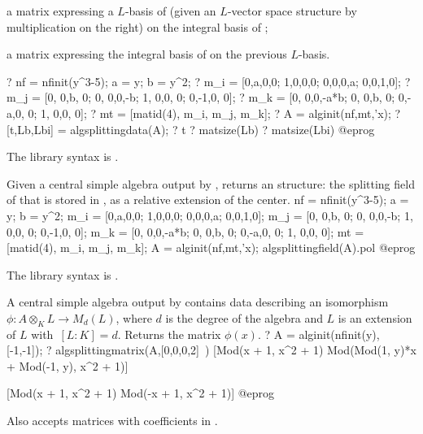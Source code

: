  \item a matrix  expressing a $L$-basis of  (given an
$L$-vector space structure by multiplication on the right) on the integral
basis of ;

 \item a matrix  expressing the integral basis of  on
the previous $L$-basis.

\bprog
? nf = nfinit(y^3-5); a = y; b = y^2;
? {m_i = [0,a,0,0;
          1,0,0,0;
          0,0,0,a;
          0,0,1,0];}
? {m_j = [0, 0,b, 0;
          0, 0,0,-b;
          1, 0,0, 0;
          0,-1,0, 0];}
? {m_k = [0, 0,0,-a*b;
          0, 0,b,   0;
          0,-a,0,   0;
          1, 0,0,   0];}
? mt = [matid(4), m_i, m_j, m_k];
? A = alginit(nf,mt,'x);
? [t,Lb,Lbi] = algsplittingdata(A);
? t
? matsize(Lb)
? matsize(Lbi)
@eprog

The library syntax is .

\label{se:algsplittingfield}
Given a central simple algebra  output by , returns
an  structure: the splitting field of  that is stored in
, as a relative extension of the center.
\bprog
nf = nfinit(y^3-5);
a = y; b = y^2;
{m_i = [0,a,0,0;
       1,0,0,0;
       0,0,0,a;
       0,0,1,0];}
{m_j = [0, 0,b, 0;
       0, 0,0,-b;
       1, 0,0, 0;
       0,-1,0, 0];}
{m_k = [0, 0,0,-a*b;
       0, 0,b,   0;
       0,-a,0,   0;
       1, 0,0,   0];}
mt = [matid(4), m_i, m_j, m_k];
A = alginit(nf,mt,'x);
algsplittingfield(A).pol
@eprog

The library syntax is .

\label{se:algsplittingmatrix}
A central simple algebra  output by  contains data
describing an isomorphism~$\phi : A\otimes_K L \to M_d(L)$, where $d$ is the
degree of the algebra and $L$ is an extension of $L$ with~$[L:K]=d$. Returns
the matrix $\phi(x)$.
\bprog
? A = alginit(nfinit(y), [-1,-1]);
? algsplittingmatrix(A,[0,0,0,2]~)
[Mod(x + 1, x^2 + 1) Mod(Mod(1, y)*x + Mod(-1, y), x^2 + 1)]

[Mod(x + 1, x^2 + 1)                   Mod(-x + 1, x^2 + 1)]
@eprog

Also accepts matrices with coefficients in .

